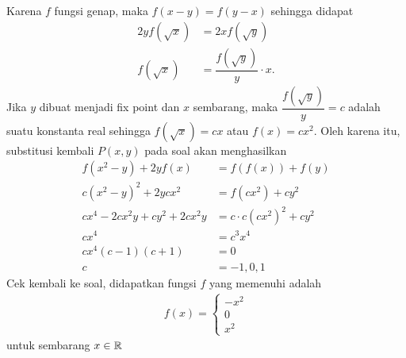 \begin{solusi}
    Karena $f$ fungsi genap, maka $f(x-y)=f(y-x)$ sehingga didapat
    \begin{align*}
        2yf(\sqrt{x}) &= 2xf(\sqrt{y})\\
        f(\sqrt{x}) &= \dfrac{f(\sqrt{y})}{y}\cdot x.
    \end{align*}
    Jika $y$ dibuat menjadi fix point dan $x$ sembarang, maka $\dfrac{f(\sqrt{y})}{y}=c$ adalah suatu konstanta real sehingga $f(\sqrt{x})=cx$ atau $f(x)=cx^2$. Oleh karena itu, substitusi kembali $P(x,y)$ pada soal akan menghasilkan
    \begin{align*}
        f(x^2-y)+2yf(x)&=f(f(x))+f(y)\\
        c(x^2-y)^2+2ycx^2 &= f(cx^2) + cy^2\\
        cx^4-2cx^2y+cy^2 + 2cx^2y &= c\cdot c(cx^2)^2 + cy^2\\
        cx^4 &= c^3x^4\\
        cx^4(c-1)(c+1)&=0\\
        c &= -1,0,1
    \end{align*}
    Cek kembali ke soal, didapatkan fungsi $f$ yang memenuhi adalah
    \begin{align*}
        f(x) = 
        \begin{cases}
            -x^2\\
            0\\
            x^2
        \end{cases}
    \end{align*}
     untuk sembarang $x \in \mathbb R$
\end{solusi}